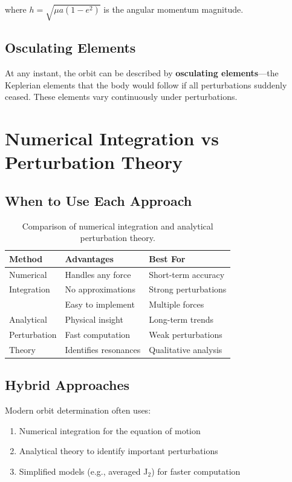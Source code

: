 where $h = \sqrt{\mu a(1-e^2)}$ is the angular momentum magnitude.

\subsection{Osculating Elements}

At any instant, the orbit can be described by \textbf{osculating elements}—the Keplerian elements that the body would follow if all perturbations suddenly ceased. These elements vary continuously under perturbations.

\section{Numerical Integration vs Perturbation Theory}

\subsection{When to Use Each Approach}

\begin{table}[htbp]
\centering
\begin{tabular}{lll}
\toprule
\textbf{Method} & \textbf{Advantages} & \textbf{Best For} \\
\midrule
Numerical & Handles any force & Short-term accuracy \\
Integration & No approximations & Strong perturbations \\
 & Easy to implement & Multiple forces \\
\midrule
Analytical & Physical insight & Long-term trends \\
Perturbation & Fast computation & Weak perturbations \\
Theory & Identifies resonances & Qualitative analysis \\
\bottomrule
\end{tabular}
\caption{Comparison of numerical integration and analytical perturbation theory.}
\label{tab:methods}
\end{table}

\subsection{Hybrid Approaches}

Modern orbit determination often uses:
\begin{enumerate}
    \item Numerical integration for the equation of motion
    \item Analytical theory to identify important perturbations
    \item Simplified models (e.g., averaged J$_2$) for faster computation
\end{enumerate}

